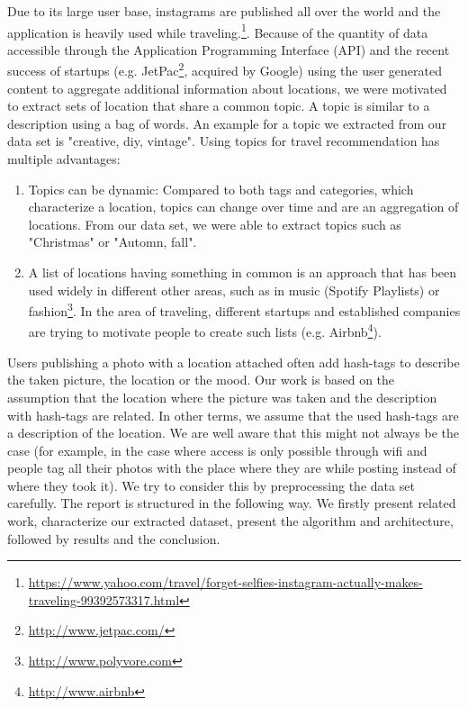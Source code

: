 Due to its large user base, instagrams are published all over the world and the application is heavily used while traveling.\footnote{\url{https://www.yahoo.com/travel/forget-selfies-instagram-actually-makes-traveling-99392573317.html}}. Because of the quantity of data accessible through the Application Programming Interface (API) and the recent success of startups (e.g. JetPac\footnote{\url{http://www.jetpac.com/}}, acquired by Google) using the user generated content to aggregate additional information about locations, we were motivated to extract sets of location that share a common topic. A topic is similar to a description using a bag of words. An example for a topic we extracted from our data set is "creative, diy, vintage". Using topics for travel recommendation has multiple advantages:
\begin{enumerate}
  \item Topics can be dynamic: Compared to both tags and categories, which characterize a location, topics can change over time and are an aggregation of locations. From our data set, we were able to extract topics such as "Christmas" or "Automn, fall".
  \item A list of locations having something in common is an approach that has been used widely in different other areas, such as in music (Spotify Playlists) or fashion\footnote{\url{http://www.polyvore.com}}. In the area of traveling, different startups and established companies are trying to motivate people to create such lists (e.g. Airbnb\footnote{\url{http://www.airbnb}}).
\end{enumerate}

Users publishing a photo with a location attached often add hash-tags to describe the taken picture, the location or the mood. Our work is based on the assumption that the location where the picture was taken and the description with hash-tags are related. In other terms, we assume that the used hash-tags are a description of the location. We are well aware that this might not always be the case (for example, in the case where access is only possible through wifi and people tag all their photos with the place where they are while posting instead of where they took it). We try to consider this by preprocessing the data set carefully. The report is structured in the following way. We firstly present related work, characterize our extracted dataset, present the algorithm and architecture, followed by results and the conclusion.

